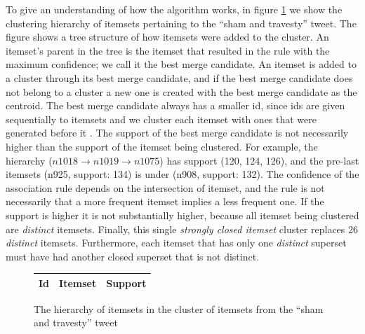 \documentclass[letterpaper,12pt,titlepage,oneside,final]{book}
\begin{document}
To give an understanding of how the algorithm works,
in figure \ref{fig:hierSham} we show the clustering hierarchy of itemsets pertaining to
the ``sham and travesty'' tweet.
The figure shows a tree structure of how itemsets 
were added to the cluster.
An itemset's parent in the tree is the itemset
that resulted in the rule with the maximum confidence;
we call it the best merge candidate.
An itemset is added to a cluster
through its best merge candidate, 
and if the best merge candidate 
does not belong to a cluster
a new one is created with 
the best merge candidate as the centroid.
The best merge candidate always has a smaller id, 
since ids are given sequentially to itemsets 
and we cluster each itemset with ones that were
generated before it .
The support of the best merge candidate is not necessarily higher than
the support of the itemset being clustered.
For example, the hierarchy ($n1018 \rightarrow n1019 \rightarrow n1075$)
has support (120, 124, 126), and
the pre-last itemsets (n925, support: 134) is 
under (n908, support: 132).
The confidence of the association rule
depends on the intersection of itemset,
and the rule is not necessarily that
a more frequent itemset implies
a less frequent one.
If the support is higher it is not substantially higher,
because all itemset being clustered are \emph{distinct} itemsets. 
Finally, this single \emph{strongly closed itemset} cluster 
replaces 26  \emph{distinct} itemsets. 
Furthermore, each itemset that has only one 
\emph{distinct} superset must have had 
another closed superset that is not distinct.




\begin{landscape}
\begin{figure}
\begin{tabular}{p{0.8cm}p{17.5cm}p{2cm}}
Id & Itemset &  Support\\ \hline
\end{tabular}
\caption{The hierarchy of itemsets in the cluster of itemsets from the ``sham and travesty'' tweet}
\label{fig:hierSham}
\end{figure}
\end{landscape}
\end{document}
